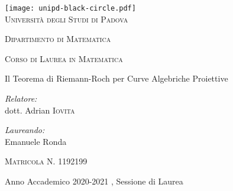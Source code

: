 \begin{titlepage}
 
    \begin{center}
     
    \texttt{[image: unipd-black-circle.pdf]}
    \\
    \vspace{1cm}
    \textsc{\LARGE Università degli Studi di Padova}
    
    \vspace{1.5cm}
     
    \textsc{\Large Dipartimento di Matematica }
    
    \vspace{1.5cm}
    
    
    \textsc{\Large Corso di Laurea in Matematica}\hspace{0.8cm}
     
    \vspace{0.8cm}
    
    \Huge \doublespacing \bfseries \begin{spacing}{0.8}{Il Teorema di Riemann-Roch per Curve Algebriche Proiettive}\end{spacing}
    \hfill
    
    \vspace{0.5cm}
    
    \begin{flushleft} \large
    \emph{Relatore:} \\
    dott. Adrian \textsc{Iovita}
    \end{flushleft}
    \vfill
    \begin{flushright} \large
    \emph{Laureando:}\\
    Emanuele Ronda
    
    \textsc{Matricola N. 1192199}
    \end{flushright}
    
    {\small Anno Accademico 2020-2021 , Sessione di Laurea }
    
    \end{center}
    
    \end{titlepage}